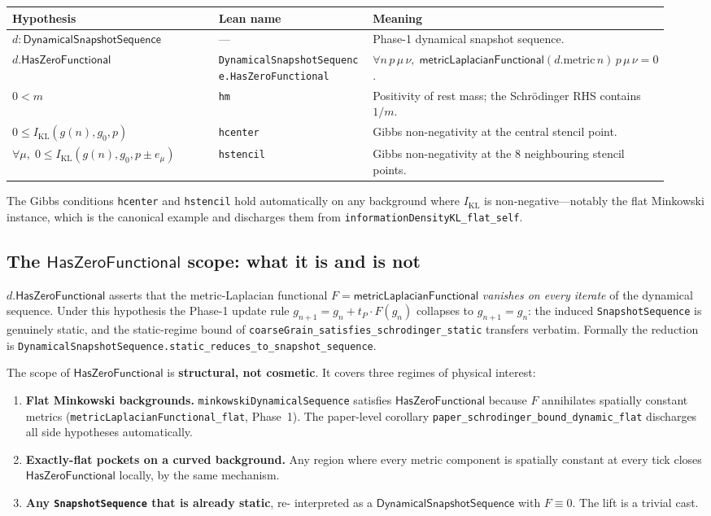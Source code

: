 \documentclass[11pt,a4paper,twoside]{article}
\theoremstyle{definition}
\newcommand{\KL}{I_{\mathrm{KL}}}
\newcommand{\tP}{t_P}
\newcommand{\HasZF}{\mathsf{HasZeroFunctional}}
\newcommand{\DynSeq}{\mathsf{DynamicalSnapshotSequence}}
\newcommand{\code}[1]{\texttt{#1}}
\begin{document}
\begin{longtable}{@{}p{0.32\linewidth} p{0.26\linewidth} p{0.36\linewidth}@{}}
\toprule
Hypothesis & Lean name & Meaning \\
\midrule
\endhead
$d:\DynSeq$ & --- & Phase-1 dynamical snapshot sequence. \\
$d.\HasZF$ & \code{DynamicalSnapshotSequence.HasZeroFunctional} & $\forall n\,p\,\mu\,\nu,\;\mathsf{metricLaplacianFunctional}(d.\mathrm{metric}\,n)\,p\,\mu\,\nu = 0$. \\
$0<m$ & \code{hm} & Positivity of rest mass; the Schr\"odinger RHS contains $1/m$. \\
$0\le\KL(g(n),g_{0},p)$ & \code{hcenter} & Gibbs non-negativity at the central stencil point. \\
$\forall\mu,\;0\le\KL(g(n),g_{0},p\pm e_{\mu})$ & \code{hstencil} & Gibbs non-negativity at the 8 neighbouring stencil points. \\
\bottomrule
\end{longtable}

\noindent The Gibbs conditions \code{hcenter} and \code{hstencil} hold
automatically on any background where $\KL$ is non-negative---notably
the flat Minkowski instance, which is the canonical example and
discharges them from \code{informationDensityKL\_flat\_self}.

\subsection{The \texorpdfstring{$\HasZF$}{HasZeroFunctional} scope:
what it is and is not}\label{sec:T2-scope}

$d.\HasZF$ asserts that the metric-Laplacian functional
$F=\mathsf{metricLaplacianFunctional}$ \emph{vanishes on every iterate}
of the dynamical sequence. Under this hypothesis the Phase-1 update
rule $g_{n+1}=g_{n}+\tP\cdot F(g_{n})$ collapses to $g_{n+1}=g_{n}$:
the induced \code{SnapshotSequence} is genuinely static, and the
static-regime bound of
\code{coarseGrain\_satisfies\_schrodinger\_static} transfers verbatim.
Formally the reduction is
\code{DynamicalSnapshotSequence.static\_reduces\_to\_snapshot\_sequence}.

The scope of $\HasZF$ is \textbf{structural, not cosmetic}. It covers
three regimes of physical interest:
\begin{enumerate}
\item \textbf{Flat Minkowski backgrounds.}
  \code{minkowskiDynamicalSequence} satisfies $\HasZF$ because $F$
  annihilates spatially constant metrics
  (\code{metricLaplacianFunctional\_flat}, Phase~1). The paper-level
  corollary \code{paper\_schrodinger\_bound\_dynamic\_flat}
  discharges all side hypotheses automatically.
\item \textbf{Exactly-flat pockets on a curved background.} Any region
  where every metric component is spatially constant at every tick
  closes $\HasZF$ locally, by the same mechanism.
\item \textbf{Any \code{SnapshotSequence} that is already static}, re-
  interpreted as a $\DynSeq$ with $F\equiv 0$. The lift is a trivial
  cast.
\end{enumerate}
\end{document}
